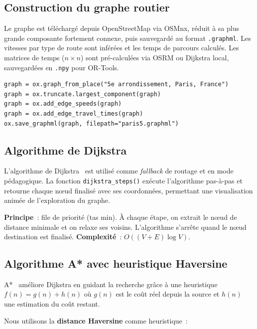 \documentclass[a4paper, 12pt, twoside]{article}
\begin{document}
\subsection{Construction du graphe routier}

Le graphe est t\'{e}l\'{e}charg\'{e} depuis OpenStreetMap via OSMnx, r\'{e}duit \`{a} sa plus grande composante fortement connexe, puis sauvegard\'{e} au format \texttt{.graphml}. Les vitesses par type de route sont inf\'{e}r\'{e}es et les temps de parcours calcul\'{e}s. Les matrices de temps ($n \times n$) sont pr\'{e}-calcul\'{e}es via OSRM ou Dijkstra local, sauvegard\'{e}es en \texttt{.npy} pour OR-Tools.

\begin{lstlisting}[caption={Chargement et pr\'{e}paration du graphe OSM}, label=lst:graph]
graph = ox.graph_from_place("5e arrondissement, Paris, France")
graph = ox.truncate.largest_component(graph)
graph = ox.add_edge_speeds(graph)
graph = ox.add_edge_travel_times(graph)
ox.save_graphml(graph, filepath="paris5.graphml")
\end{lstlisting}

\subsection{Algorithme de Dijkstra}

L'algorithme de Dijkstra~\cite{dijkstra} est utilis\'{e} comme \textit{fallback} de routage et en mode p\'{e}dagogique. La fonction \texttt{dijkstra\_steps()} ex\'{e}cute l'algorithme pas-\`{a}-pas et retourne chaque n\oe ud finalis\'{e} avec ses coordonn\'{e}es, permettant une visualisation anim\'{e}e de l'exploration du graphe.

\textbf{Principe}~: file de priorit\'{e} (tas min). \`{A} chaque \'{e}tape, on extrait le n\oe ud de distance minimale et on relaxe ses voisins. L'algorithme s'arr\^{e}te quand le n\oe ud destination est finalis\'{e}. \textbf{Complexit\'{e}}~: $O((V + E) \log V)$.

\subsection{Algorithme A* avec heuristique Haversine}

A*~\cite{astar} am\'{e}liore Dijkstra en guidant la recherche gr\^{a}ce \`{a} une heuristique $f(n) = g(n) + h(n)$ o\`{u} $g(n)$ est le co\^{u}t r\'{e}el depuis la source et $h(n)$ une estimation du co\^{u}t restant.

Nous utilisons la \textbf{distance Haversine} comme heuristique~:
\end{document}
